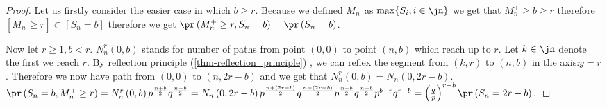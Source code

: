 \begin{proof}
 Let us firstly consider the easier case in which $b \geq r$. Because we defined $ M_n^+$ as $\max \{S_i, i\in \jn \}$ we get that $ M_n^+ \geq b \geq r$
 therefore $[ M_n^+ \geq r] \subset [S_n=b]$ therefore we get $\pr \left(  M_n^+\geq r, S_n=b \right) =
 \pr \left( S_n=b \right) $.

 Now let $r\geq 1, b<r$. $N_n^r \left( 0,b \right) $ stands for number of paths from point $ \left( 0,0 \right) $ to point $ \left( n,b \right) $ which reach up to $r$.
 Let $k \in \jn$ denote the first \Time we reach $r$. By reflection principle (\ref{thm-reflection_principle}) , we can reflex the segment from $\left(k,r\right)$ to $ \left( n,b \right) $ in the axis:$y=r$.
 Therefore we now have path from $ \left( 0,0 \right) $ to $ \left( n,2r-b \right) $ and we get that $N_n^r \left( 0,b \right) =N_n \left( 0,2r-b \right) $. $\pr \left( S_n=b, M_n^+\geq r \right) =N_n^r \left( 0,b \right) p^{\frac{n+b}{2}}q^{\frac{n-b}{2}}=
 N_n \left( 0,2r-b \right) p^{\frac{n+ \left( 2r-b \right) }{2}}q^{\frac{n- \left( 2r-b \right) }{2}}p^{\frac{n+b}{2}}q^{\frac{n-b}{2}}p^{b-r}q^{r-b}= \left( \frac{q}{p} \right) ^{r-b}\pr \left( S_n=2r-b \right).$
\end{proof}

